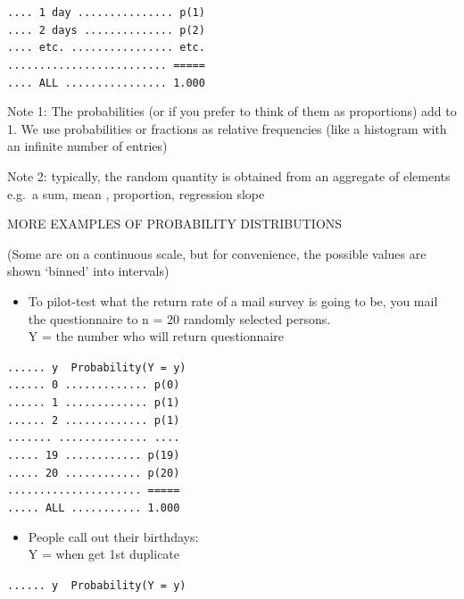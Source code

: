 \documentclass[]{book}
\providecommand{\tightlist}{%
  \setlength{\itemsep}{0pt}\setlength{\parskip}{0pt}}
\begin{document}
\texttt{....\ 1\ day\ ...............\ p(1)}\\
\texttt{....\ 2\ days\ ..............\ p(2)}~\\
\texttt{....\ etc.\ ................\ etc.}~\\
\texttt{.........................\ =====}~\\
\texttt{....\ ALL\ ................\ 1.000}

Note 1: The probabilities (or if you prefer to think of them as proportions) add to 1. We use probabilities or fractions as relative frequencies (like a histogram with an infinite number of entries)

Note 2: typically, the random quantity is obtained from an aggregate of elements e.g.~a sum, mean , proportion, regression slope

MORE EXAMPLES OF PROBABILITY DISTRIBUTIONS

(Some are on a continuous scale, but for convenience, the possible values are shown `binned' into intervals)

\begin{itemize}
\tightlist
\item
  To pilot-test what the return rate of a mail survey is going to be, you mail the questionnaire to n = 20 randomly selected persons.\\
  Y = the number who will return questionnaire
\end{itemize}

\texttt{......\ y\ \ Probability(Y\ =\ y)}\\
\texttt{......\ 0\ .............\ p(0)}~\\
\texttt{......\ 1\ .............\ p(1)}~\\
\texttt{......\ 2\ .............\ p(1)}~\\
\texttt{.......\ ..............\ ....}~\\
\texttt{.....\ 19\ ............\ p(19)}~\\
\texttt{.....\ 20\ ............\ p(20)}~\\
\texttt{.....................\ =====}~\\
\texttt{.....\ ALL\ ...........\ 1.000}

\begin{itemize}
\tightlist
\item
  People call out their birthdays:\\
  Y = when get 1st duplicate
\end{itemize}

\texttt{......\ y\ \ Probability(Y\ =\ y)}
\end{document}
